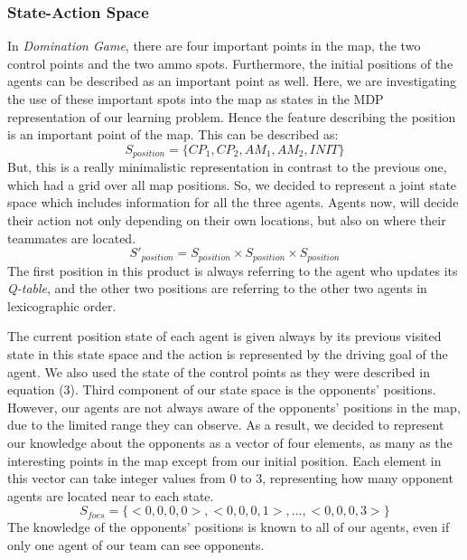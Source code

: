 \documentclass[conference]{IEEEtran}
\begin{document}
\subsubsection{State-Action Space}
In \textit{Domination Game}, there are four important points in the map, the two control points and the two ammo spots. Furthermore, the initial positions of the agents can be described as an important point as well. Here, we are investigating the use of these important spots into the map as states in the MDP representation of our learning problem. Hence the feature describing the position is an important point of the map. This can be described as:
\begin{equation}
S_{position} = \lbrace CP_1, CP_2, AM_1, AM_2, INIT  \rbrace
\end{equation}
But, this is a really minimalistic representation in contrast to the previous one, which had a grid over all map positions. So, we decided to represent a joint state space which includes information for all the three agents. Agents now, will decide their action not only depending on their own locations, but also on where their teammates are located.
\begin{equation}
S'_{position} = S_{position} \times S_{position} \times S_{position}
\end{equation}
The first position in this product is always referring to the agent who updates its \textit{Q-table}, and the other two positions are referring to the other two agents in lexicographic order.

The current position state of each agent is given always by its previous visited state in this state space and the action is represented by the driving goal of the agent. We also used the state of the control points as they were described in equation (3). Third component of our state space is the opponents' positions. However, our agents are not always aware of the opponents' positions in the map, due to the limited range they can observe. As a result, we decided to represent our knowledge about the opponents as a vector of four elements, as many as the interesting points in the map except from our initial position. Each element in this vector can take integer values from $0$ to $3$, representing how many opponent agents are located near to each state.
\begin{equation}
S_{foes} = \lbrace <0,0,0,0>, <0,0,0,1>, \ldots, <0,0,0,3>  \rbrace
\end{equation}
The knowledge of the opponents' positions is known to all of our agents, even if only one agent of our team can see opponents.
\end{document}
